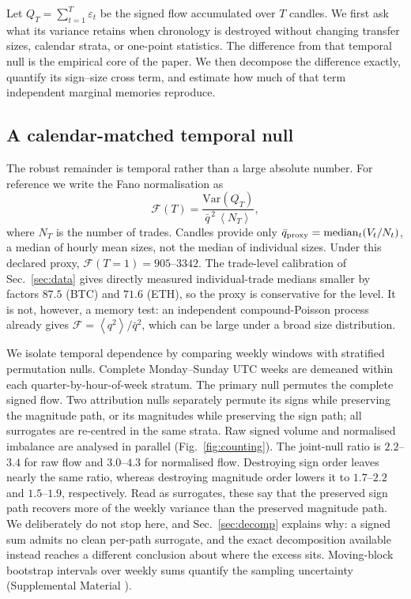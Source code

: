 \documentclass[aps,pre,twocolumn,superscriptaddress,floatfix,nofootinbib]{revtex4-2}
\newcommand{\eps}{\varepsilon}
\newcommand{\avg}[1]{\left\langle #1 \right\rangle}
\newcommand{\Var}{\mathrm{Var}}
\begin{document}
Let $Q_T=\sum_{t=1}^{T}\eps_t$ be the signed flow accumulated over $T$
candles. We first ask what its variance retains when chronology is destroyed
without changing transfer sizes, calendar strata, or one-point statistics.
The difference from that temporal null is the empirical core of the paper.
We then decompose the difference exactly, quantify its sign--size cross term,
and estimate how much of that term independent marginal memories reproduce.

\subsection{A calendar-matched temporal null}
\label{sec:whatdoesnotclose}

The robust remainder is temporal rather than a large absolute number. For
reference we write the Fano normalisation as
\begin{equation}
  \mathcal{F}(T)=\frac{\Var(Q_T)}{\bar q^{\,2}\,\avg{N_T}} ,
  \label{eq:fano}
\end{equation}
where $N_T$ is the number of trades. Candles provide only
$\bar q_{\rm proxy}=\operatorname{median}_t(V_t/N_t)$, a median of hourly mean
sizes, not the median of individual sizes. Under this declared proxy,
$\mathcal F(T{=}1)=905$--$3342$. The trade-level calibration of
Sec.~\ref{sec:data} gives directly measured individual-trade medians smaller by factors $87.5$ (BTC) and
$71.6$ (ETH), so the proxy is conservative for the level. It is not, however,
a memory test: an independent compound-Poisson process already gives
$\mathcal F=\avg{q^2}/\bar q^2$, which can be large under a broad size
distribution.

We isolate temporal dependence by comparing weekly windows with stratified
permutation nulls. Complete Monday--Sunday UTC weeks are demeaned within each
quarter-by-hour-of-week stratum. The primary null permutes the complete signed
flow. Two attribution nulls separately permute its signs while preserving the
magnitude path, or its magnitudes while preserving the sign path; all
surrogates are re-centred in the same strata. Raw signed volume and normalised
imbalance are analysed in parallel (Fig.~\ref{fig:counting}). The joint-null
ratio is $2.2$--$3.4$ for
raw flow and $3.0$--$4.3$ for normalised flow. Destroying sign order leaves
nearly the same ratio, whereas destroying magnitude order lowers it to
$1.7$--$2.2$ and $1.5$--$1.9$, respectively. Read as surrogates, these say that
the preserved sign path recovers more of the weekly variance than the preserved
magnitude path. We deliberately do not stop here, and Sec.~\ref{sec:decomp}
explains why: a signed sum admits no clean per-path surrogate, and the exact
decomposition available instead reaches a different conclusion about where the
excess sits. Moving-block bootstrap intervals over weekly sums quantify
the sampling uncertainty (Supplemental Material \cite{supplement}).
\end{document}
